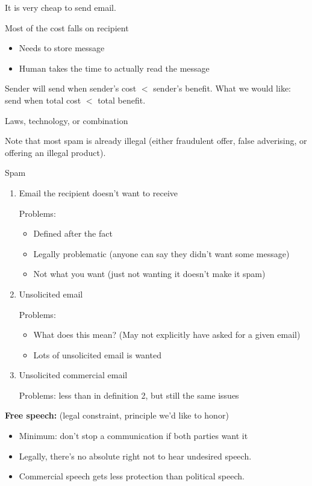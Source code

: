 It is very cheap to send email.

Most of the cost falls on recipient
\begin{itemize}
    \item Needs to store message
    \item Human takes the time to actually read the message
\end{itemize}
Sender will send when sender's cost $<$ sender's benefit. 
What we would like: send when total cost $<$ total benefit.

Laws, technology, or combination

Note that most spam is already illegal (either fraudulent offer, false
    adverising, or offering an illegal product).

\begin{definition}{Spam}
\begin{enumerate}
    \item Email the recipient doesn't want to receive

        Problems:
        \begin{itemize}
            \item Defined after the fact
            \item Legally problematic (anyone can say they didn't want some
                    message)
            \item Not what you want (just not wanting it doesn't make it spam)
        \end{itemize}
    \item Unsolicited email

        Problems:
        \begin{itemize}
            \item What does this mean? (May not explicitly have asked for a
                    given email)
            \item Lots of unsolicited email is wanted
        \end{itemize}
    \item Unsolicited commercial email

        Problems: less than in definition 2, but still the same issues
\end{enumerate}
\end{definition}

{\bf Free speech:} (legal constraint, principle we'd like to honor)
\begin{itemize}
    \item Minimum: don't stop a communication if both parties want it
    \item Legally, there's no absolute right not to hear undesired speech.
    \item Commercial speech gets less protection than political speech.
\end{itemize}

